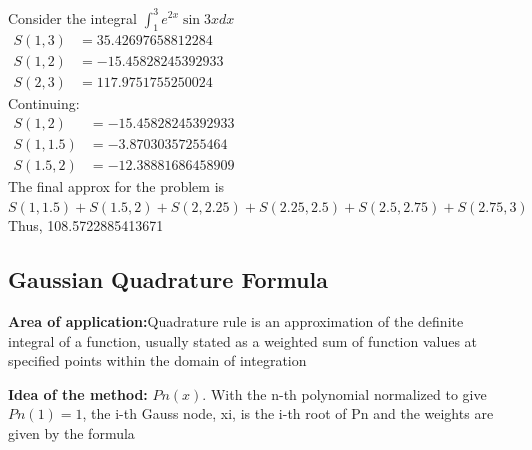 \documentclass{article}
\begin{document}
Consider the integral  $\int _ { 1 } ^ { 3 } e ^ { 2 x } \sin 3 x d x$\\
$\begin{aligned} S ( 1,3 ) & = 35.42697658812284 \\ S ( 1,2 ) & = - 15.45828245392933 \\ S ( 2,3 ) & = 117.9751755250024 \end{aligned}$\\
Continuing:\\
$\begin{aligned} S ( 1,2 ) & = - 15.45828245392933 \\ S ( 1,1.5 ) & = - 3.87030357255464 \\ S ( 1.5,2 ) & = - 12.38881686458909 \end{aligned}$\\
The final approx for the problem is \\
$S ( 1,1.5 ) + S ( 1.5,2 ) + S ( 2,2.25 ) + S ( 2.25,2.5 ) + S ( 2.5,2.75 ) + S ( 2.75,3 )$
Thus, 108.5722885413671
	\subsection{Gaussian Quadrature Formula}
{\bf Area of application:}Quadrature rule is an approximation of the definite integral of a function, usually stated as a weighted sum of function values at specified points within the domain of integration

{\bf Idea of the method:} 
$ Pn(x) $. With the n-th polynomial normalized to give $ Pn(1) = 1 $, the i-th Gauss node, xi, is the i-th root of Pn and the weights are given by the formula
\end{document}
